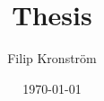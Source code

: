 \documentclass{article}
\title{Thesis}
\author{Filip Kronström}
\date{\today}
\begin{document}
\maketitle
\section{}
\end{document}
